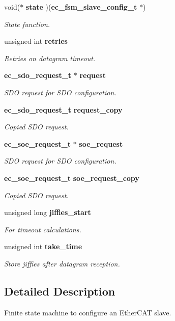 \begin{DoxyCompactItemize}
void($\ast$ {\bf state} )({\bf ec\-\_\-fsm\-\_\-slave\-\_\-config\-\_\-t} $\ast$)
\begin{DoxyCompactList}\small\item\em State function. \end{DoxyCompactList}\item 
unsigned int {\bf retries}
\begin{DoxyCompactList}\small\item\em Retries on datagram timeout. \end{DoxyCompactList}\item 
{\bf ec\-\_\-sdo\-\_\-request\-\_\-t} $\ast$ {\bf request}
\begin{DoxyCompactList}\small\item\em S\-D\-O request for S\-D\-O configuration. \end{DoxyCompactList}\item 
{\bf ec\-\_\-sdo\-\_\-request\-\_\-t} {\bf request\-\_\-copy}
\begin{DoxyCompactList}\small\item\em Copied S\-D\-O request. \end{DoxyCompactList}\item 
{\bf ec\-\_\-soe\-\_\-request\-\_\-t} $\ast$ {\bf soe\-\_\-request}
\begin{DoxyCompactList}\small\item\em S\-D\-O request for S\-D\-O configuration. \end{DoxyCompactList}\item 
{\bf ec\-\_\-soe\-\_\-request\-\_\-t} {\bf soe\-\_\-request\-\_\-copy}
\begin{DoxyCompactList}\small\item\em Copied S\-D\-O request. \end{DoxyCompactList}\item 
unsigned long {\bf jiffies\-\_\-start}
\begin{DoxyCompactList}\small\item\em For timeout calculations. \end{DoxyCompactList}\item 
unsigned int {\bf take\-\_\-time}
\begin{DoxyCompactList}\small\item\em Store jiffies after datagram reception. \end{DoxyCompactList}\end{DoxyCompactItemize}


\subsection{Detailed Description}
Finite state machine to configure an Ether\-C\-A\-T slave. 

